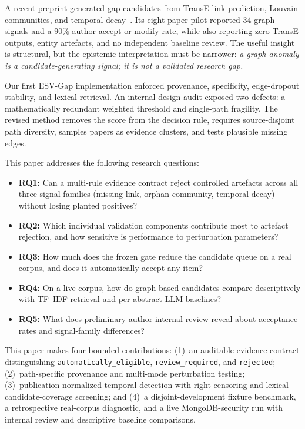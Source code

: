 \documentclass[conference, onecolumn]{IEEEtran}
\newcommand{\statuseligible}{\texttt{automatically\_eligible}}
\begin{document}
A recent preprint generated gap candidates from TransE link prediction, Louvain communities, and temporal decay~\cite{rahul2026dynamic}. Its eight-paper pilot reported 34 graph signals and a 90\% author accept-or-modify rate, while also reporting zero TransE outputs, entity artefacts, and no independent baseline review. The useful insight is structural, but the epistemic interpretation must be narrower: \emph{a graph anomaly is a candidate-generating signal; it is not a validated research gap.}

Our first ESV-Gap implementation enforced provenance, specificity, edge-dropout stability, and lexical retrieval. An internal design audit exposed two defects: a mathematically redundant weighted threshold and single-path fragility. The revised method removes the score from the decision rule, requires source-disjoint path diversity, samples papers as evidence clusters, and tests plausible missing edges.

This paper addresses the following research questions:
\begin{itemize}
  \item \textbf{RQ1:} Can a multi-rule evidence contract reject controlled artefacts across all three signal families (missing link, orphan community, temporal decay) without losing planted positives?
  \item \textbf{RQ2:} Which individual validation components contribute most to artefact rejection, and how sensitive is performance to perturbation parameters?
  \item \textbf{RQ3:} How much does the frozen gate reduce the candidate queue on a real corpus, and does it automatically accept any item?
  \item \textbf{RQ4:} On a live corpus, how do graph-based candidates compare descriptively with TF--IDF retrieval and per-abstract LLM baselines?
  \item \textbf{RQ5:} What does preliminary author-internal review reveal about acceptance rates and signal-family differences?
\end{itemize}

This paper makes four bounded contributions: (1)~an auditable evidence contract distinguishing \statuseligible{}, \texttt{review\_required}, and \texttt{rejected}; (2)~path-specific provenance and multi-mode perturbation testing; (3)~publication-normalized temporal detection with right-censoring and lexical candidate-coverage screening; and (4)~a disjoint-development fixture benchmark, a retrospective real-corpus diagnostic, and a live MongoDB-security run with internal review and descriptive baseline comparisons.
\end{document}

